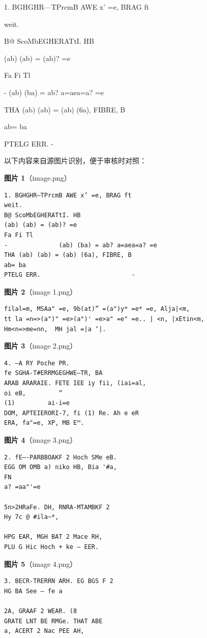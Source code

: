 \begin{example}[阶的例题]

1. BGHGHR—TPrcmB AWE x’ =e, BRAG ft

weit.

B@ ScoMbEGHERATtI. HB

(ab) (ab) = (ab)? =e

Fa Fi Tl

-              (ab) (ba) = ab? a=aea=a? =e

THA (ab) (ab) = (ab) (6a), FIBRE, B

ab= ba

PTELG ERR.                         -

\end{example}

\begin{note}
以下内容来自源图片识别，便于审核时对照：

\textbf{图片 1}（image.png）
\begin{Verbatim}[fontsize=\small]
1. BGHGHR—TPrcmB AWE x’ =e, BRAG ft
weit.
B@ ScoMbEGHERATtI. HB
(ab) (ab) = (ab)? =e
Fa Fi Tl
-              (ab) (ba) = ab? a=aea=a? =e
THA (ab) (ab) = (ab) (6a), FIBRE, B
ab= ba
PTELG ERR.                         -
\end{Verbatim}

\textbf{图片 2}（image 1.png）
\begin{Verbatim}[fontsize=\small]
filal=m, MSAa" =e, 9b(at)” =(a")y* =e* =e, Alja|<m,
tt la =n=>(a")" =e>(a")' =e>a" =e" =e.. | <n, |xEtin<m,
Hm<n=>me=nn,  MH jal =|a ‘|.
\end{Verbatim}

\textbf{图片 3}（image 2.png）
\begin{Verbatim}[fontsize=\small]
4. —A RY Poche PR.
fe SGHA-T#ERRMGEGHWE—TR, BA
ARAB ARARAIE. FETE IEE iy fii, (iai=al,
oi eB,         ”
(1)         ai-i=e
DOM, APTEIERORI-7, fi (1) Re. Ah e eR
ERA, fa"=e, XP, MB E™.
\end{Verbatim}

\textbf{图片 4}（image 3.png）
\begin{Verbatim}[fontsize=\small]
2. fE—-PARBBOAKF 2 Hoch SMe eB.
EGG OM OMB a) niko HB, Bia '#a,
FN
a? =aa"'=e

5n>2HRaFe. DH, RNRA-MTAMBKF 2
Hy 7c @ #ila~*,

HPG EAR, MGH BAT 2 Mace RH,
PLU G Hic Hoch + ke — EER.
\end{Verbatim}

\textbf{图片 5}（image 4.png）
\begin{Verbatim}[fontsize=\small]
3. BECR-TRERRN ARH. EG BGS F 2
HG BA See — fe a

2A, GRAAF 2 WEAR. (8
GRATE LNT BE RMGe. THAT ABE
a, ACERT 2 Nac PEE AH,
\end{Verbatim}

\end{note}

